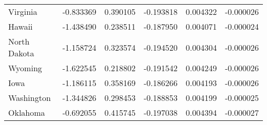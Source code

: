 \begin{tabular}{lrrrrr}
Virginia & -0.833369 & 0.390105 & -0.193818 & 0.004322 & -0.000026 \\
Hawaii & -1.438490 & 0.238511 & -0.187950 & 0.004071 & -0.000024 \\
North Dakota & -1.158724 & 0.323574 & -0.194520 & 0.004304 & -0.000026 \\
Wyoming & -1.622545 & 0.218802 & -0.191542 & 0.004249 & -0.000026 \\
Iowa & -1.186115 & 0.358169 & -0.186266 & 0.004193 & -0.000026 \\
Washington & -1.344826 & 0.298453 & -0.188853 & 0.004199 & -0.000025 \\
Oklahoma & -0.692055 & 0.415745 & -0.197038 & 0.004394 & -0.000027 \\
\bottomrule
\end{tabular}
